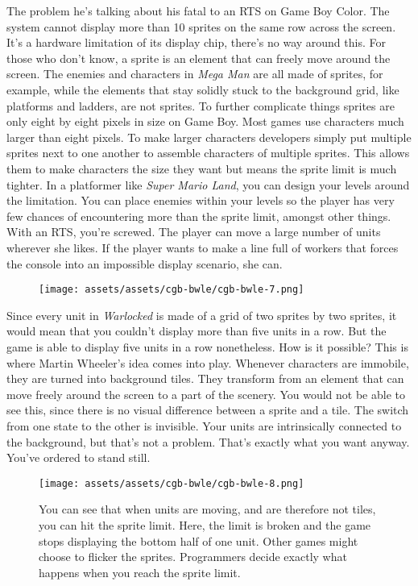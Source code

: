 \documentclass{book}
\begin{document}
The problem he’s talking about his fatal to an RTS on Game Boy Color. The system cannot display more than 10 sprites on the same row across the screen. It’s a hardware limitation of its display chip, there’s no way around this. For those who don’t know, a sprite is an element that can freely move around the screen. The enemies and characters in \emph{Mega Man} are all made of sprites, for example, while the elements that stay solidly stuck to the background grid, like platforms and ladders, are not sprites. To further complicate things sprites are only eight by eight pixels in size on Game Boy. Most games use characters much larger than eight pixels. To make larger characters developers simply put multiple sprites next to one another to assemble characters of multiple sprites. This allows them to make characters the size they want but means the sprite limit is much tighter. In a platformer like \emph{Super Mario Land}, you can design your levels around the limitation. You can place enemies within your levels so the player has very few chances of encountering more than the sprite limit, amongst other things. With an RTS, you’re screwed. The player can move a large number of units wherever she likes. If the player wants to make a line full of workers that forces the console into an impossible display scenario, she can.

\begin{figure}[hbt]
\vskip 10pt
\centering \texttt{[image: assets/assets/cgb-bwle/cgb-bwle-7.png]}
\vskip 6pt
\end{figure}

Since every unit in \emph{Warlocked} is made of a grid of two sprites by two sprites, it would mean that you couldn’t display more than five units in a row. But the game is able to display five units in a row nonetheless. How is it possible? This is where Martin Wheeler’s idea comes into play. Whenever characters are immobile, they are turned into background tiles. They transform from an element that can move freely around the screen to a part of the scenery. You would not be able to see this, since there is no visual difference between a sprite and a tile. The switch from one state to the other is invisible. Your units are intrinsically connected to the background, but that’s not a problem. That’s exactly what you want anyway. You’ve ordered to stand still.

\begin{figure}[hbt]
\vskip 10pt
\centering \texttt{[image: assets/assets/cgb-bwle/cgb-bwle-8.png]}\par\pagetwodescription You can see that when units are moving, and are therefore not tiles, you can hit the sprite limit. Here, the limit is broken and the game stops displaying the bottom half of one unit. Other games might choose to flicker the sprites. Programmers decide exactly what happens when you reach the sprite limit.
\vskip 6pt
\end{figure}
\end{document}
